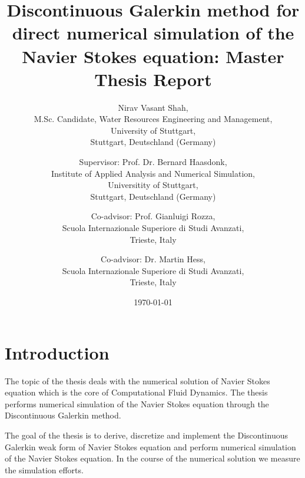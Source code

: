 \documentclass[a4paper,12pt]{book}
\begin{document}
\begin{center}

\title{Discontinuous Galerkin method for direct numerical simulation of the Navier Stokes equation: Master Thesis Report}


\author{Nirav Vasant Shah, \\M.Sc. Candidate, Water Resources Engineering and Management, \\University of Stuttgart, \\Stuttgart, Deutschland (Germany)\\ 
\and Supervisor: Prof. Dr. Bernard Haasdonk,\\ Institute of Applied Analysis and Numerical Simulation, \\Universitity of Stuttgart,\\ Stuttgart, Deutschland (Germany)\\ \and Co-advisor: Prof. Gianluigi Rozza,\\ Scuola Internazionale Superiore di Studi Avanzati, \\Trieste, Italy \\ \and Co-advisor: Dr. Martin Hess,\\ Scuola Internazionale Superiore di Studi Avanzati, \\Trieste, Italy }
\date{\today}
\maketitle

\end{center}

\tableofcontents

\newenvironment{spmatrix}[1]
 {\def\mysubscript{#1}\mathop\bgroup\begin{pmatrix}}
 {\end{pmatrix}\egroup_{\textstyle\mathstrut\mysubscript}}

\chapter{Introduction}

The topic of the thesis deals with the numerical solution of Navier Stokes equation which is the core of Computational Fluid Dynamics. The thesis performs numerical simulation of the Navier Stokes equation through the Discontinuous Galerkin method.

The goal of the thesis is to derive, discretize and implement the Discontinuous Galerkin weak form of Navier Stokes equation and perform numerical simulation of the Navier Stokes equation. In the course of the numerical solution we measure the simulation efforts.
\end{document}
